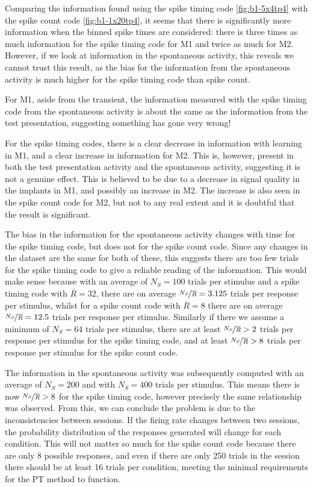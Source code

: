 Comparing the information found using the spike timing code \ref{fig:b1-5x4tp4} with the spike count code \ref{fig:b1-1x20tp4}, it seems that there is significantly more information when the binned spike times are considered: there is three times as much information for the spike timing code for \ac{M1} and twice as much for \ac{M2}.
However, if we look at information in the spontaneous activity, this reveals we cannot trust this result, as the bias for the information from the spontaneous activity is much higher for the spike timing code than spike count.

For \ac{M1}, aside from the transient, the information measured with the spike timing code from the spontaneous activity is about the same as the information from the test presentation, suggesting something has gone very wrong!

For the spike timing codes, there is a clear decrease in information with learning in \ac{M1}, and a clear increase in information for \ac{M2}.
This is, however, present in both the test presentation activity and the spontaneous activity, suggesting it is not a genuine effect.
This is believed to be due to a decrease in signal quality in the implants in \ac{M1}, and possibly an increase in \ac{M2}.
The increase is also seen in the spike count code for \ac{M2}, but not to any real extent and it is doubtful that the result is significant.

The bias in the information for the spontaneous activity changes with time for the spike timing code, but does not for the spike count code.
Since any changes in the dataset are the same for both of these, this suggests there are too few trials for the spike timing code to give a reliable reading of the information.
This would make sense because with an average of $N_S = 100$ trials per stimulus and a spike timing code with $\overline{R} = 32$, there are
on average $\nicefrac{N_S}{\overline{R}} = 3.125$ trials per response per stimulus,
whilst for a spike count code with $\overline{R} = 8$ there are on average $\nicefrac{N_S}{\overline{R}} = 12.5$ trials per response per stimulus.
Similarly if there we assume a minimum of $N_S = 64$ trials per stimulus, there are
at least $\nicefrac{N_S}{\overline{R}} > 2$ trials per response per stimulus for the spike timing code, and
at least $\nicefrac{N_S}{\overline{R}} > 8$ trials per response per stimulus for the spike count code.

The information in the spontaneous activity was subsequently computed with an average of $N_S = 200$ and with $N_S = 400$ trials per stimulus.
This means there is now $\nicefrac{N_S}{\overline{R}} > 8$ for the spike timing code, however precisely the same relationship was observed.
From this, we can conclude the problem is due to the inconsistencies between sessions.
If the firing rate changes between two sessions, the probability distribution of the responses generated will change for each condition.
This will not matter so much for the spike count code because there are only 8 possible responses, and even if there are only 250 trials in the session there should be at least 16 trials per condition, meeting the minimal requirements for the \ac{PT} method to function.

